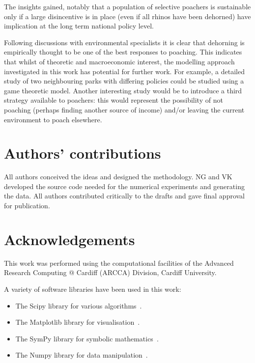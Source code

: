 \documentclass[10pt]{article}
\begin{document}
The insights gained, notably that a population of selective poachers is
sustainable only if a large disincentive is in place (even if all rhinos have
been dehorned) have implication at the long term national policy level.

Following discussions with environmental specialists it is clear that dehorning
is empirically thought to be one of the best responses to poaching. This
indicates that whilst of theoretic and macroeconomic interest, the modelling
approach investigated in this work has potential for further work. For example,
a detailed study of two neighbouring parks with differing policies could be
studied using a game theoretic model. Another interesting study would be to
introduce a third strategy available to poachers: this would represent the
possibility of not poaching (perhaps finding another source of income) and/or
leaving the current environment to poach elsewhere.

\section*{Authors' contributions}

All authors conceived the ideas and designed the methodology. NG and VK developed the
source code needed for the numerical experiments and generating the data. All authors
contributed critically to the drafts and gave final approval for publication.

\section*{Acknowledgements}

This work was performed using the computational facilities of the Advanced
Research Computing @ Cardiff (ARCCA) Division, Cardiff University.

A variety of software libraries have been used in this work:

\begin{itemize}
    \item The Scipy library for various algorithms~\citep{scipy}.
    \item The Matplotlib library for visualisation~\citep{hunter2007matplotlib}.
    \item The SymPy library for symbolic mathematics~\citep{sympy}.
    \item The Numpy library for data manipulation~\citep{walt2011numpy}.
\end{itemize}
\end{document}
